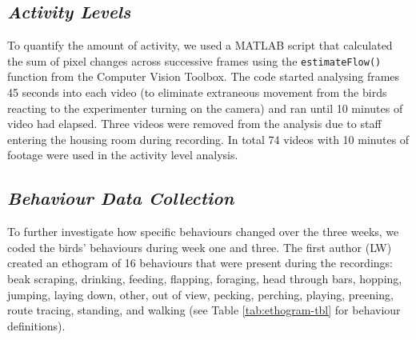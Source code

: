 \documentclass[
  pub]{apa6}
\begin{document}
\subsection{\texorpdfstring{\emph{Activity Levels}}{Activity Levels}}\label{activity-levels}

To quantify the amount of activity, we used a MATLAB script that calculated the sum of pixel changes across successive frames using the \texttt{estimateFlow()} function from the Computer Vision Toolbox. The code started analysing frames 45 seconds into each video (to eliminate extraneous movement from the birds reacting to the experimenter turning on the camera) and ran until 10 minutes of video had elapsed. Three videos were removed from the analysis due to staff entering the housing room during recording. In total 74 videos with 10 minutes of footage were used in the activity level analysis.

\subsection{\texorpdfstring{\emph{Behaviour Data Collection}}{Behaviour Data Collection}}\label{behaviour-data-collection}

To further investigate how specific behaviours changed over the three weeks, we coded the birds' behaviours during week one and three. The first author (LW) created an ethogram of 16 behaviours that were present during the recordings: beak scraping, drinking, feeding, flapping, foraging, head through bars, hopping, jumping, laying down, other, out of view, pecking, perching, playing, preening, route tracing, standing, and walking (see Table \ref{tab:ethogram-tbl} for behaviour definitions).
\end{document}
